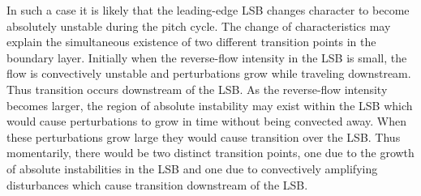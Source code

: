 In such a case it is likely that the leading-edge LSB changes character to become absolutely unstable during the pitch cycle. The change of characteristics may explain the simultaneous existence of two different transition points in the boundary layer. Initially when the reverse-flow intensity in the LSB is small, the flow is convectively unstable and perturbations grow while traveling downstream. Thus transition occurs downstream of the LSB. As the reverse-flow intensity becomes larger, the region of absolute instability may exist within the LSB which would cause perturbations to grow in time without being convected away. When these perturbations grow large they would cause transition over the LSB. Thus momentarily, there would be two distinct transition points, one due to the growth of absolute instabilities in the LSB and one due to convectively amplifying disturbances which cause transition downstream of the LSB.

